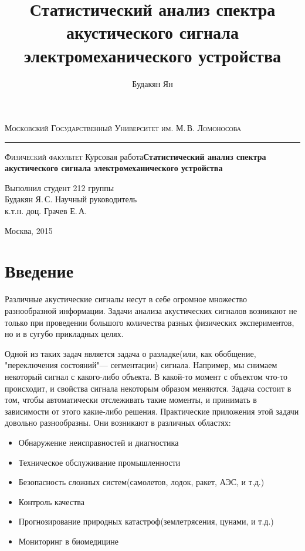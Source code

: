 \documentclass[12pt,a4paper]{article}
\author{Будакян Ян}
\title{Статистический анализ спектра акустического сигнала электромеханического устройства}
\begin{document}
\begin{titlepage}
\begin{center}
{\small\textsc{Московский Государственный Университет им. М.\,В. Ломоносова}}
\vskip 1pt \hrule \vskip 3pt
{\small\textsc{Физический факультет}}
\vfill
{\Large Курсовая работа\vskip 12pt\bfseries Статистический анализ спектра акустического сигнала \space электромеханического устройства}	
\end{center}
\vfill
\begin{flushright}
{Выполнил студент 212 группы \\Будакян Я.\,С.\vskip 12pt Научный руководитель \\к.т.н. доц. Грачев Е.\,А.}
\end{flushright}
\vfill
\begin{center}
Москва, 2015
\end{center}
\end{titlepage}

\tableofcontents
\newpage

\section{Введение}

Различные акустические сигналы несут в себе огромное множество разнообразной информации. Задачи анализа акустических сигналов возникают не только при проведении большого количества разных физических экспериментов, но и в сугубо прикладных целях.

Одной из таких задач является задача о разладке(или, как обобщение, "переключения состояний"\space --- сегментации) сигнала. Например, мы снимаем некоторый сигнал с какого-либо объекта. В какой-то момент с объектом что-то происходит, и свойства сигнала некоторым образом меняются. Задача состоит в том, чтобы автоматически отслеживать такие моменты, и принимать в зависимости от этого какие-либо решения. Практические приложения этой задачи довольно разнообразны. Они возникают в различных областях:
\begin{itemize}
\item Обнаружение неисправностей и диагностика
\item Техническое обслуживание промышленности
\item Безопасность сложных систем(самолетов, лодок, ракет, АЭС, и т.д.)
\item Контроль качества
\item Прогнозирование природных катастроф(землетрясения, цунами, и т.д.)
\item Мониторинг в биомедицине 
\end{itemize}
\end{document}
